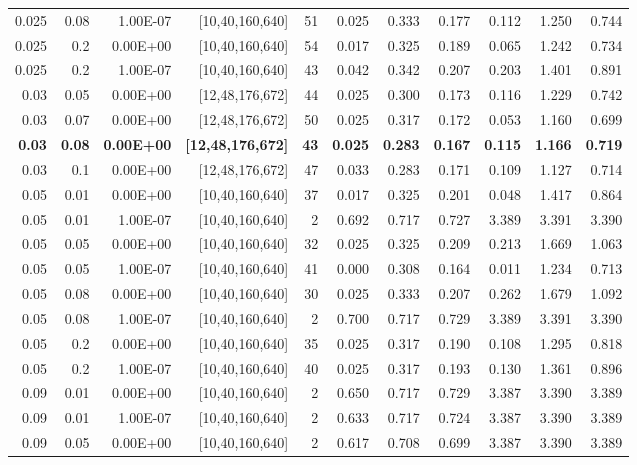 \begin{table}[f]
\begin{tabular}{@{}rrrrrrrrrrr@{}}
0.025 & 0.08 & 1.00E-07 & {[}10,40,160,640{]} & 51 & 0.025 & 0.333 & 0.177 & 0.112 & 1.250 & 0.744 \\
0.025 & 0.2 & 0.00E+00 & {[}10,40,160,640{]} & 54 & 0.017 & 0.325 & 0.189 & 0.065 & 1.242 & 0.734 \\
0.025 & 0.2 & 1.00E-07 & {[}10,40,160,640{]} & 43 & 0.042 & 0.342 & 0.207 & 0.203 & 1.401 & 0.891 \\
0.03 & 0.05 & 0.00E+00 & {[}12,48,176,672{]} & 44 & 0.025 & 0.300 & 0.173 & 0.116 & 1.229 & 0.742 \\
0.03 & 0.07 & 0.00E+00 & {[}12,48,176,672{]} & 50 & 0.025 & 0.317 & 0.172 & 0.053 & 1.160 & 0.699 \\
\textbf{0.03} & \textbf{0.08} & \textbf{0.00E+00} & \textbf{{[}12,48,176,672{]}} & \textbf{43} & \textbf{0.025} & \textbf{0.283} & \textbf{0.167} & \textbf{0.115} & \textbf{1.166} & \textbf{0.719} \\
0.03 & 0.1 & 0.00E+00 & {[}12,48,176,672{]} & 47 & 0.033 & 0.283 & 0.171 & 0.109 & 1.127 & 0.714 \\
0.05 & 0.01 & 0.00E+00 & {[}10,40,160,640{]} & 37 & 0.017 & 0.325 & 0.201 & 0.048 & 1.417 & 0.864 \\
0.05 & 0.01 & 1.00E-07 & {[}10,40,160,640{]} & 2 & 0.692 & 0.717 & 0.727 & 3.389 & 3.391 & 3.390 \\
0.05 & 0.05 & 0.00E+00 & {[}10,40,160,640{]} & 32 & 0.025 & 0.325 & 0.209 & 0.213 & 1.669 & 1.063 \\
0.05 & 0.05 & 1.00E-07 & {[}10,40,160,640{]} & 41 & 0.000 & 0.308 & 0.164 & 0.011 & 1.234 & 0.713 \\
0.05 & 0.08 & 0.00E+00 & {[}10,40,160,640{]} & 30 & 0.025 & 0.333 & 0.207 & 0.262 & 1.679 & 1.092 \\
0.05 & 0.08 & 1.00E-07 & {[}10,40,160,640{]} & 2 & 0.700 & 0.717 & 0.729 & 3.389 & 3.391 & 3.390 \\
0.05 & 0.2 & 0.00E+00 & {[}10,40,160,640{]} & 35 & 0.025 & 0.317 & 0.190 & 0.108 & 1.295 & 0.818 \\
0.05 & 0.2 & 1.00E-07 & {[}10,40,160,640{]} & 40 & 0.025 & 0.317 & 0.193 & 0.130 & 1.361 & 0.896 \\
0.09 & 0.01 & 0.00E+00 & {[}10,40,160,640{]} & 2 & 0.650 & 0.717 & 0.729 & 3.387 & 3.390 & 3.389 \\
0.09 & 0.01 & 1.00E-07 & {[}10,40,160,640{]} & 2 & 0.633 & 0.717 & 0.724 & 3.387 & 3.390 & 3.389 \\
0.09 & 0.05 & 0.00E+00 & {[}10,40,160,640{]} & 2 & 0.617 & 0.708 & 0.699 & 3.387 & 3.390 & 3.389 \\

\end{tabular}
\end{table}
